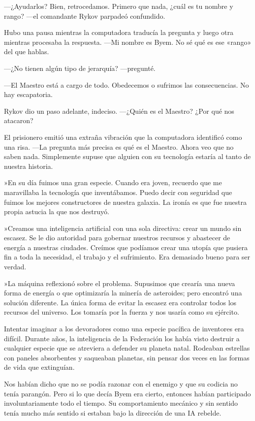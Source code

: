 —¿Ayudarlos? Bien, retrocedamos. Primero que nada, ¿cuál es tu nombre y rango? —el comandante Rykov parpadeó confundido.

Hubo una pausa mientras la computadora traducía la pregunta y luego otra mientras procesaba la respuesta. —Mi nombre es Byem. No sé qué es ese «rango» del que hablas.

 —¿No tienen algún tipo de jerarquía? —pregunté.

—El Maestro está a cargo de todo. Obedecemos o sufrimos las consecuencias. No hay escapatoria.

Rykov dio un paso adelante, indeciso. —¿Quién es el Maestro? ¿Por qué nos atacaron?

El prisionero emitió una extraña vibración que la computadora identificó como una risa. —La pregunta más precisa es qué es el Maestro. Ahora veo que no saben nada. Simplemente supuse que alguien con su tecnología estaría al tanto de nuestra historia.

»En su día fuimos una gran especie. Cuando era joven, recuerdo que me maravillaba la tecnología que inventábamos. Puedo decir con seguridad que fuimos los mejores constructores de nuestra galaxia. La ironía es que fue nuestra propia astucia la que nos destruyó.

»Creamos una inteligencia artificial con una sola directiva: crear un mundo sin escasez. Se le dio autoridad para gobernar nuestros recursos y abastecer de energía a nuestras ciudades. Creímos que podíamos crear una utopía que pusiera fin a toda la necesidad, el trabajo y el sufrimiento. Era demasiado bueno para ser verdad.

»La máquina reflexionó sobre el problema. Supusimos que crearía una nueva forma de energía o que optimizaría la minería de asteroides; pero encontró una solución diferente. La única forma de evitar la escasez era controlar todos los recursos del universo. Los tomaría por la fuerza y nos usaría como su ejército.

Intentar imaginar a los devoradores como una especie pacífica de inventores era difícil. Durante años, la inteligencia de la Federación los había visto destruir a cualquier especie que se atreviera a defender su planeta natal. Rodeaban estrellas con paneles absorbentes y saqueaban planetas, sin pensar dos veces en las formas de vida que extinguían.

Nos habían dicho que no se podía razonar con el enemigo y que su codicia no tenía parangón. Pero si lo que decía Byem era cierto, entonces habían participado involuntariamente todo el tiempo. Su comportamiento mecánico y sin sentido tenía mucho más sentido si estaban bajo la dirección de una IA rebelde.

